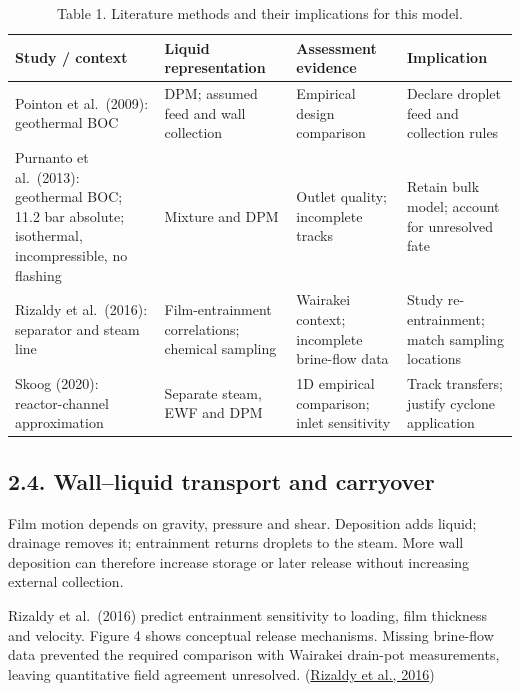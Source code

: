 \documentclass[
  12pt,
  a4paper,
]{article}
\begin{document}
\begin{table}[htbp]
\centering
\caption*{Table 1. Literature methods and their implications for this model.}
{\setlength{\tabcolsep}{4pt}\begin{tabular}{@{}>{\raggedright\arraybackslash}p{3.94912cm}>{\raggedright\arraybackslash}p{3.30912cm}>{\raggedright\arraybackslash}p{3.46912cm}>{\raggedright\arraybackslash}p{4.42912cm}@{}}
\toprule
\textbf{Study / context} & \textbf{Liquid representation} & \textbf{Assessment evidence} & \textbf{Implication} \\
\midrule
Pointon et al.~(2009): geothermal BOC & DPM; assumed feed and wall collection & Empirical design comparison & Declare droplet feed and collection rules \\
Purnanto et al.~(2013): geothermal BOC; 11.2 bar absolute; isothermal,
incompressible, no flashing & Mixture and DPM & Outlet quality; incomplete tracks & Retain bulk model; account for unresolved fate \\
Rizaldy et al.~(2016): separator and steam line & Film-entrainment correlations; chemical sampling & Wairakei context; incomplete brine-flow data & Study re-entrainment; match sampling locations \\
Skoog (2020): reactor-channel approximation & Separate steam, EWF and DPM & 1D empirical comparison; inlet sensitivity & Track transfers; justify cyclone application \\
\bottomrule
\end{tabular}}
\end{table}

\subsection{2.4. Wall--liquid transport and
carryover}\label{wallliquid-transport-and-carryover}

Film motion depends on gravity, pressure and shear. Deposition adds
liquid; drainage removes it; entrainment returns droplets to the steam.
More wall deposition can therefore increase storage or later release
without increasing external collection.

Rizaldy et al.~(2016) predict entrainment sensitivity to loading, film
thickness and velocity. Figure 4 shows conceptual release mechanisms.
Missing brine-flow data prevented the required comparison with Wairakei
drain-pot measurements, leaving quantitative field agreement unresolved.
(\href{https://www.researchgate.net/publication/310818568_LIQUID_CARRYOVER_IN_GEOTHERMAL_STEAM-WATER_SEPARATORS}{Rizaldy
et al., 2016})
\end{document}
